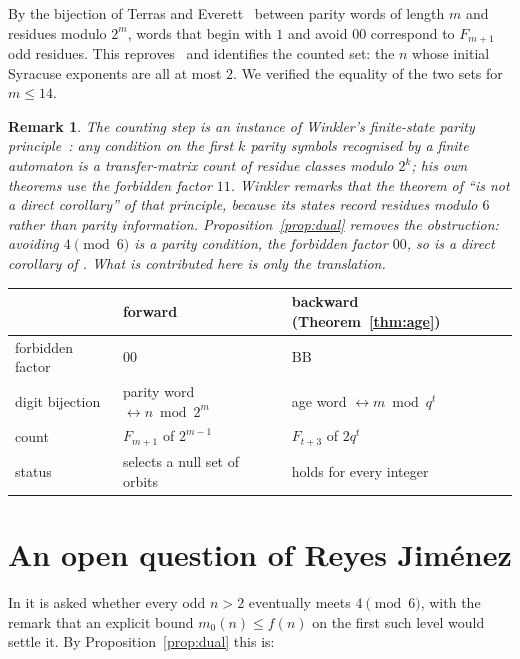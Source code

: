 \documentclass[11pt]{article}
\newtheorem{remarkx}[theorem]{Remark}
\newenvironment{remark}{\begin{remarkx}\rmfamily}{\end{remarkx}}
\newcommand{\toprule}{\hline}\newcommand{\midrule}{\hline}\newcommand{\bottomrule}{\hline}
\begin{document}
By the bijection of Terras and Everett~\cite{Te,Ev} between parity words of length $m$ and residues modulo
$2^{m}$, words that begin with $1$ and avoid $00$ correspond to $F_{m+1}$ odd residues. This reproves~\cite[Theorem
4.7]{RJ} and identifies the counted set: the $n$ whose initial Syracuse exponents are all at most $2$. We verified
the equality of the two sets for $m\le 14$.

\begin{remark}\label{rem:winkler}
The counting step is an instance of Winkler's finite-state parity principle~\cite[Proposition 5.1]{Wk}: any
condition on the first $k$ parity symbols recognised by a finite automaton is a transfer-matrix count of residue
classes modulo $2^{k}$; his own theorems use the forbidden factor $11$. Winkler remarks that the theorem of
\cite{RJ} ``is not a direct corollary'' of that principle, because its states record residues modulo $6$ rather
than parity information. Proposition~\ref{prop:dual} removes the obstruction: avoiding $4 \pmod 6$ \emph{is} a
parity condition, the forbidden factor $00$, so \cite[Theorem 4.7]{RJ} is a direct corollary of
\cite[Proposition 5.1]{Wk}. What is contributed here is only the translation.
\end{remark}

\begin{center}
\begin{tabular}{lll}
\toprule
 & forward \cite{RJ} & backward (Theorem~\ref{thm:age})\\
\midrule
forbidden factor & $00$ & $\mathrm{BB}$\\
digit bijection & parity word $\leftrightarrow n \bmod 2^{m}$ & age word $\leftrightarrow m\bmod q^{t}$\\
count & $F_{m+1}$ of $2^{m-1}$ & $F_{t+3}$ of $2q^{t}$\\
status & selects a null set of orbits & holds for every integer\\
\bottomrule
\end{tabular}
\end{center}

\section{An open question of Reyes Jim\'enez}

In \cite[Section~5]{RJ} it is asked whether every odd $n>2$ eventually meets $4 \pmod 6$, with the remark that an
explicit bound $m_0(n)\le f(n)$ on the first such level would settle it. By Proposition~\ref{prop:dual} this is:
\end{document}
